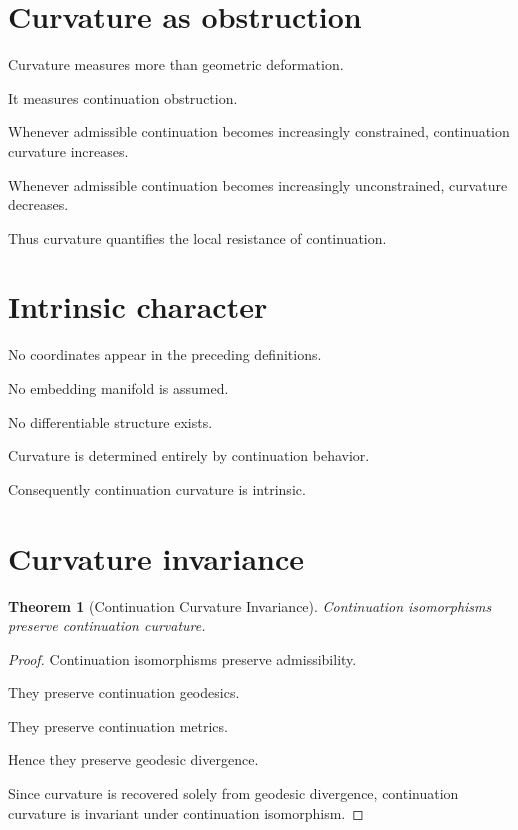 \documentclass[13pt,openany]{book}
\theoremstyle{plain}
\newtheorem{theorem}{Theorem}[chapter]
\theoremstyle{definition}
\begin{document}

\section{Curvature as obstruction}

Curvature measures more than geometric deformation.

It measures continuation obstruction.

Whenever admissible continuation becomes increasingly constrained, continuation curvature increases.

Whenever admissible continuation becomes increasingly unconstrained, curvature decreases.

Thus curvature quantifies the local resistance of continuation.


\section{Intrinsic character}

No coordinates appear in the preceding definitions.

No embedding manifold is assumed.

No differentiable structure exists.

Curvature is determined entirely by continuation behavior.

Consequently continuation curvature is intrinsic.


\section{Curvature invariance}

\begin{theorem}[Continuation Curvature Invariance]

Continuation isomorphisms preserve continuation curvature.

\end{theorem}

\begin{proof}

Continuation isomorphisms preserve admissibility.

They preserve continuation geodesics.

They preserve continuation metrics.

Hence they preserve geodesic divergence.

Since curvature is recovered solely from geodesic divergence, continuation curvature is invariant under continuation isomorphism.

\end{proof}
\end{document}
